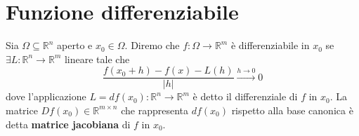 \documentclass[openany, italian]{book}
\begin{document}
\section{Funzione differenziabile}

\begin{definition}
Sia $\Omega \subseteq \mathbb{R}^n$ aperto e $x_0 \in \Omega$. Diremo che $f: \Omega \to \mathbb{R}^m$ è differenziabile in $x_0$ se $\exists L: \mathbb{R}^n \to \mathbb{R}^m$ lineare tale che
$$
\frac{f(x_0 + h)-f(x) - L(h)}{|h|} \stackrel{h \to 0}{\to} 0
$$
dove l'applicazione $L = df(x_0): \mathbb{R}^n \to \mathbb{R}^m$ è detto il differenziale di $f$ in $x_0$. La matrice $Df(x_0) \in \mathbb{R}^{m \times n}$ che rappresenta $df(x_0)$ rispetto alla base canonica è detta \textbf{matrice jacobiana} di $f$ in $x_0$.
\end{definition}
\end{document}
